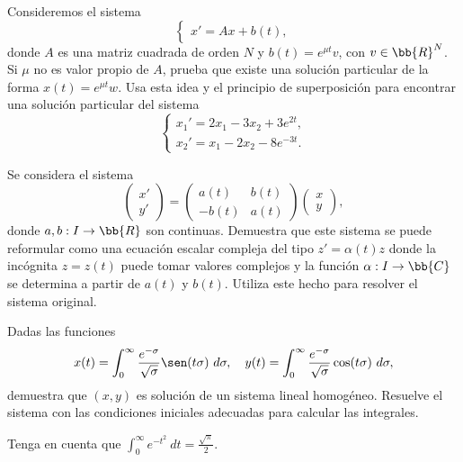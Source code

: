 \begin{ejercicio}\label{ej:5.4}
    Consideremos el sistema
    \[
        \begin{cases}
            x' = Ax + b(t),
        \end{cases}
    \]
    donde $A$ es una matriz cuadrada de orden $N$ y $b(t) = e^{\mu t}v$, con $v \in \bb{R}^N$. Si $\mu$ no es valor propio de $A$, prueba que existe una solución particular de la forma $x(t) = e^{\mu t}w$. Usa esta idea y el principio de superposición para encontrar una solución particular del sistema
    \[
        \begin{cases}
            x_1' = 2x_1 - 3x_2 + 3e^{2t},\\
            x_2' = x_1 - 2x_2 - 8e^{-3t}.
        \end{cases}
    \]
\end{ejercicio}

\begin{ejercicio}\label{ej:5.5}
    Se considera el sistema
    \[
        \begin{pmatrix}
            x'\\
            y'
        \end{pmatrix}
        =
        \begin{pmatrix}
            a(t) & b(t)\\
            -b(t) & a(t)
        \end{pmatrix}
        \begin{pmatrix}
            x\\
            y
        \end{pmatrix},
    \]
    donde $a, b : I \to \bb{R}$ son continuas. Demuestra que este sistema se puede reformular como una ecuación escalar compleja del tipo $z' = \alpha(t)z$ donde la incógnita $z = z(t)$ puede tomar valores complejos y la función $\alpha : I \to \bb{C}$ se determina a partir de $a(t)$ y $b(t)$. Utiliza este hecho para resolver el sistema original.
\end{ejercicio}

\begin{ejercicio}\label{ej:5.6}
    Dadas las funciones
    \[
        x(t) = \int_0^\infty \frac{e^{-\sigma}}{\sqrt{\sigma}}\sen(t\sigma)~d\sigma, \quad y(t) = \int_0^\infty \frac{e^{-\sigma}}{\sqrt{\sigma}}\cos(t\sigma)~d\sigma,
    \]
    demuestra que $(x, y)$ es solución de un sistema lineal homogéneo. Resuelve el sistema con las condiciones iniciales adecuadas para calcular las integrales.
    \begin{observacion}
        Tenga en cuenta que
        $\displaystyle \int_0^\infty e^{-t^2}~dt = \frac{\sqrt{\pi}}{2}$.
    \end{observacion}
\end{ejercicio}

